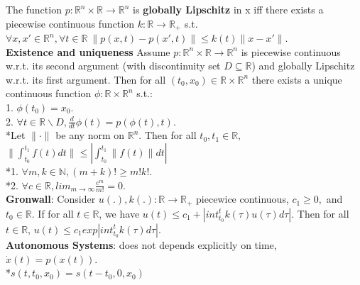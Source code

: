 \documentclass[10pt,landscape]{article}
\begin{document}
\begin{multicols*}{4}
The function $p: \mathbb{R}^n \times \mathbb{R} \rightarrow \mathbb{R}^n$ is \textbf{globally Lipschitz} in x iff there exists a piecewise continuous function $k: \mathbb{R} \rightarrow \mathbb{R}_+$ s.t.\\
$\forall x,x' \in \mathbb{R}^n, \forall t\in\mathbb{R}\ \parallel p(x,t)-p(x',t) \parallel \leq k(t)\parallel x - x' \parallel$.\\

\textbf{Existence and uniqueness} Assume $p: \mathbb{R}^n \times \mathbb{R} \rightarrow \mathbb{R}^n$ is piecewise continuous w.r.t. its second argument (with discontinuity set $D \subseteq \mathbb{R}$) and globally Lipschitz w.r.t. its first argument. Then for all $(t_0,x_0) \in \mathbb{R} \times \mathbb{R}^n$ there exists a unique continuous function $\phi: \mathbb{R} \times \mathbb{R}^n$ s.t.:\\
1. $\phi(t_0) = x_0$.\\
2. $\forall t \in \mathbb{R} \backslash D, \frac{d}{dt} \phi(t) = p(\phi(t),t)  $.\\ 

*Let $\parallel \cdot \parallel$ be any norm on $\mathbb{R}^n$. Then for all $t_0,t_1 \in \mathbb{R},$\\
$\parallel \int_{t_0}^{t_1} f(t) dt \parallel \leq | \int_{t_0}^{t_1} \parallel f(t) \parallel dt |$\\
*1. $\forall m,k \in \mathbb{N}, (m+k)! \geq m!k!.$\\
*2. $\forall c \in \mathbb{R}, lim_{m \rightarrow \infty} \frac{c^m}{m!}=0.$\\
\textbf{Gronwall}: Consider $u(.),k(.): \mathbb{R} \rightarrow \mathbb{R}_+$ piecewice continuous, $c_1 \geq 0,$ and $t_0 \in \mathbb{R}$. If for all $t \in \mathbb{R}$, we have $u(t) \leq c_1 + |int_{t_0}^{t}k(\tau)u(\tau) d\tau|$. Then for all $t \in \mathbb{R}$, $u(t) \leq c_1exp|int_{t_0}^{t}k(\tau) d\tau|$.\\
\textbf{Autonomous Systems}: does not depends explicitly on time, $\dot{x}(t) = p(x(t))$.\\
*$s(t,t_0,x_0) = s(t-t_0,0,x_0)$




\newpage

\end{multicols*}
\end{document}
